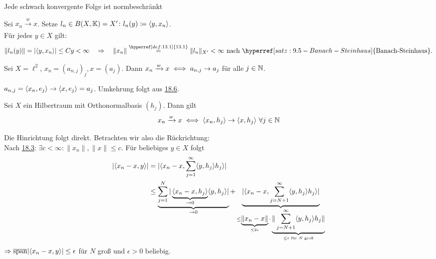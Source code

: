 \begin{prop}
	Jede schwach konvergente Folge ist normbeschränkt
\end{prop}

\begin{beweis}
	Sei $x_{n} \xrightarrow[]{w} x$. Setze $l_{n} \in B(X, \mathbb{K}) = X' \colon l_{n}(y) \coloneqq \langle y, x_{n} \rangle	$. \\
	Für jedes $y \in X$ gilt: 
	\[ \| l_{n}(y) \| = | \< y , x_{n} \> | \leq C y < \infty \quad \Rightarrow \quad \| x_{n} \| \overset{\hyperref[def:13.1]{13.1}}{=} \| l_{n} \|_{X'} < \infty \text{ nach } \hyperref[satz:9.5-Banach-Steinhaus]{\text{Banach-Steinhaus}}. \]
\end{beweis}


\begin{beispiel}
	Sei $X = \ell^{2}$, $x_{n} = (a_{n, j})_{j}, x = (a_{j})$. Dann $x_{n} \xrightarrow[]{w} x \iff a_{n, j} \rightarrow a_{j}$ für alle $j \in \mathbb{N}$.
\end{beispiel}

\begin{beweis}
	$a_{n, j} = \langle x_{n} , e_{j} \rangle \rightarrow \langle x , e_{j} \rangle = a_{j}$. Umkehrung folgt aus \hyperref[prop:18.6]{18.6}.	
\end{beweis}


\begin{prop} \label{prop:18.6}
	Sei $X$ ein Hilbertraum mit Orthonormalbasis $(h_{j})$. Dann gilt
	\[ x_{n} \xrightarrow[]{w} x \iff \langle x_{n} , h_{j} \rangle \rightarrow \langle x , h_{j} \rangle ~ \forall j \in \mathbb{N} \]
\end{prop}

\begin{beweis}
	Die Hinrichtung folgt direkt. Betrachten wir also die Rückrichtung: \\	
	Nach \hyperref[prop:18.3]{18.3}: $\exists c < \infty \colon \| x_{n} \|, \| x \| \leq c$. Für beliebiges $y \in X$ folgt
	\begin{align*}
		| \langle x_{n} - x , y \rangle | & = | \langle x_{n} - x , \sum_{j = 1}^{\infty} \langle y , h_{j} \rangle h_{j} \rangle | \\
			& \leq \underbrace{\sum_{j = 1}^{N} |\underbrace{\langle x_{n} - x , h_{j} \rangle}_{\rightarrow 0} \langle y  , h_{j} \rangle|}_{\rightarrow 0} + \underbrace{|\langle x_{n} - x ,\sum_{j = N + 1}^{\infty} \langle y , h_{j} \rangle h_{j} \rangle|}_{ \leq \underbrace{\| x_{n} - x \|}_{\leq 2 \epsilon} \cdot \underbrace{\| \sum_{j = N + 1}^{\infty} \langle y , h_{j} \rangle h_{j} \|}_{\leq \epsilon \text{ für } N \text{ gro{\ss}}}}
	\end{align*}
	$\Rightarrow \overline{\operatorname{span}} | \langle x_{n} - x , y \rangle | \leq \epsilon$ für $N$ gro{\ss} und $\epsilon > 0$ beliebig.
\end{beweis}



